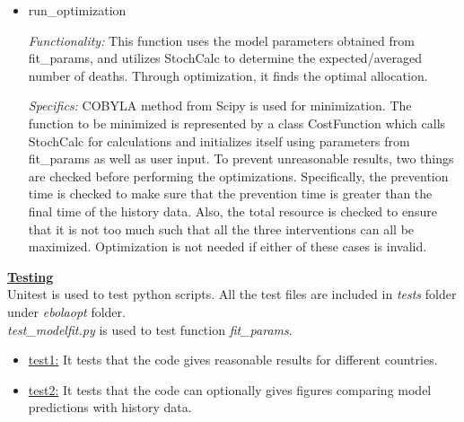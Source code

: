 \documentclass[11pt,letter]{article}
\begin{document}
\begin{itemize}
  \item run\_optimization
  
   \emph{Functionality:} 
  This function uses the model parameters obtained from fit\_params, and utilizes StochCalc to determine the expected/averaged number of deaths. Through optimization, it finds the optimal allocation.
  
 \emph{Specifics:} 
 COBYLA method from Scipy is used for minimization. The function to be minimized is represented by a class CostFunction which calls StochCalc for calculations and initializes itself using parameters from fit\_params as well as user input. To prevent unreasonable results, two things are checked before performing the optimizations. Specifically, the prevention time is checked to make sure that the prevention time is greater than the final time of the history data. Also, the total resource is checked to ensure that it is not too much such that all the three interventions can all be maximized. Optimization is not needed if either of these cases is invalid. 
\end{itemize}

\underline{\textbf{Testing}}\vspace{0.5mm}\\

Unitest is used to test python scripts. All the test files are included in \emph{tests} folder under \emph{ebolaopt} folder. \\

\emph{test\_modelfit.py} is used to test function \emph{fit\_params}. 

\begin{itemize}

\item \underline{test1:} It tests that the code gives reasonable results for different countries.
\item \underline{test2:} It tests that the code can optionally gives figures comparing model predictions with history data.

\end{itemize}
\end{document}
